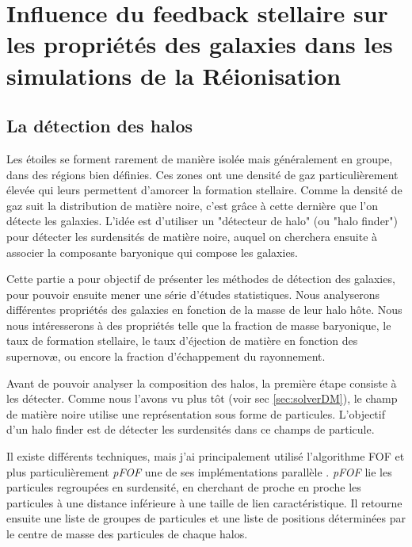 \chapter{Influence du feedback stellaire sur les propriétés des galaxies dans les simulations de la Réionisation}
\label{sec:galaxies}


\section{La détection des halos}

Les étoiles se forment rarement de manière isolée mais généralement en groupe, dans des régions bien définies. %
Ces zones ont une densité de gaz particulièrement élevée qui leurs permettent d'amorcer la formation stellaire. %
Comme la densité de gaz suit la distribution de matière noire, c'est grâce à cette dernière que l'on détecte les galaxies.
L'idée est d'utiliser un "détecteur de halo" (ou "halo finder") pour détecter les surdensités de matière noire, auquel on cherchera ensuite à associer la composante baryonique qui compose les galaxies.

Cette partie a pour objectif de présenter les méthodes de détection des galaxies, pour pouvoir ensuite mener une série d'études statistiques.
Nous analyserons différentes propriétés des galaxies en fonction de la masse de leur halo hôte.
Nous nous intéresserons à des propriétés telle que la fraction de masse baryonique, le taux de formation stellaire, le taux d'éjection de matière en fonction des supernovæ, ou encore la fraction d'échappement du rayonnement.



Avant de pouvoir analyser la composition des halos, la première étape consiste à les détecter.
Comme nous l'avons vu plus tôt (voir sec \ref{sec:solverDM}), le champ de matière noire utilise une représentation sous forme de particules.
L'objectif d'un halo finder est de détecter les surdensités dans ce champs de particule.

Il existe différents techniques, mais j'ai principalement utilisé l’algorithme \ac{FOF} et plus particulièrement \textit{pFOF} une de ses implémentations parallèle \citep{2014A&A...564A..13R}.
\textit{pFOF} lie les particules regroupées en surdensité, en cherchant de proche en proche les particules à une distance inférieure à une taille de lien caractéristique.
Il retourne ensuite une liste de groupes de particules et une liste de positions déterminées par le centre de masse des particules de chaque halos.

